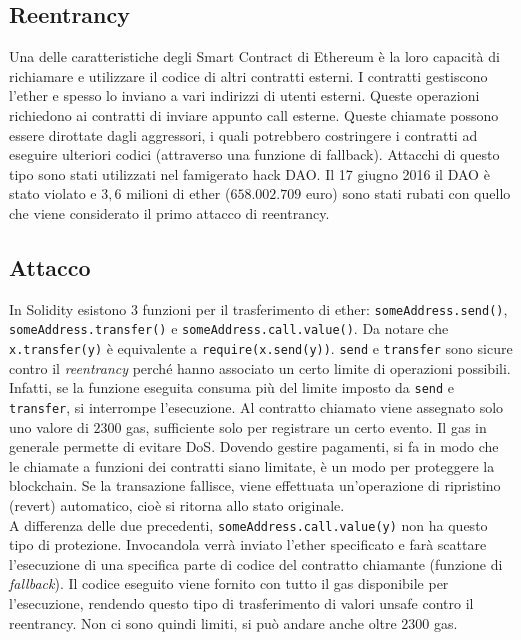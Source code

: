 \subsection{Reentrancy}

Una delle caratteristiche degli Smart Contract di Ethereum è la loro capacità di
richiamare e utilizzare il codice di altri contratti esterni. I contratti
gestiscono l'ether e spesso lo inviano a
vari indirizzi di utenti esterni. Queste operazioni richiedono ai contratti di
inviare appunto call esterne.
Queste chiamate possono essere dirottate dagli aggressori, i quali potrebbero
costringere i contratti ad eseguire ulteriori codici
(attraverso una funzione di fallback). Attacchi di questo
tipo sono stati utilizzati nel famigerato hack DAO.
Il 17 giugno 2016 il DAO è stato violato e $3,6$ milioni di ether ($658.002.709$ euro)
sono stati rubati con quello che viene considerato il primo attacco di reentrancy.

\subsection{Attacco}

In Solidity esistono 3 funzioni per il trasferimento di ether: \verb|someAddress.send()|,
\verb|someAddress.transfer()| e \verb|someAddress.call.value()|.
Da notare che \verb|x.transfer(y)| è equivalente a \verb|require(x.send(y))|.
\verb|send| e \verb|transfer| sono sicure contro il \textit{reentrancy} perché
hanno associato un certo limite di operazioni possibili.
Infatti, se la funzione eseguita consuma più del limite imposto da \verb|send| e \verb|transfer|,
si interrompe l'esecuzione.
Al contratto chiamato viene assegnato solo uno valore di $2300$
gas, sufficiente solo per registrare un certo evento.
Il gas in generale permette di evitare DoS. Dovendo gestire pagamenti,
si fa in modo che le chiamate a funzioni dei contratti siano limitate, è un modo
per proteggere la blockchain.
Se la transazione fallisce, viene effettuata un'operazione di ripristino (revert)
automatico, cioè si ritorna allo stato originale.\\
A differenza delle due precedenti, \verb|someAddress.call.value(y)| non ha questo
tipo di protezione. Invocandola verrà inviato
l'ether specificato e farà scattare
l'esecuzione di una specifica parte di codice del contratto chiamante
(funzione di \textit{fallback}).
Il codice eseguito viene fornito con tutto il gas
disponibile per l'esecuzione, rendendo
questo tipo di trasferimento di valori unsafe contro il reentrancy.
Non ci sono quindi limiti, si può andare anche oltre $2300$ gas.

